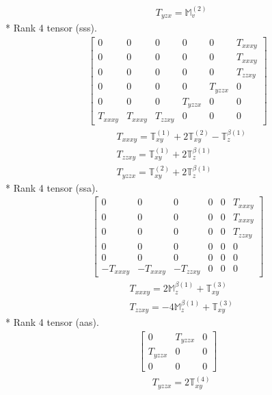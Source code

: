 \documentclass[fleqn,8pt,landscape]{jsarticle}
\begin{document}
\begin{align*}
& T_{yzx} = \mathbb{M}_{v}^{(2)}
\end{align*}
* Rank 4 tensor (sss).
\begin{align*}
\begin{bmatrix} 0 & 0 & 0 & 0 & 0 & T_{xxxy} \\ 0 & 0 & 0 & 0 & 0 & T_{xxxy} \\ 0 & 0 & 0 & 0 & 0 & T_{zzxy} \\ 0 & 0 & 0 & 0 & T_{yzzx} & 0 \\ 0 & 0 & 0 & T_{yzzx} & 0 & 0 \\ T_{xxxy} & T_{xxxy} & T_{zzxy} & 0 & 0 & 0 \end{bmatrix}
\end{align*}
\begin{align*}
& T_{xxxy} = \mathbb{T}_{xy}^{(1)} + 2 \mathbb{T}_{xy}^{(2)} - \mathbb{T}_{z}^{\beta(1)} \\
& T_{zzxy} = \mathbb{T}_{xy}^{(1)} + 2 \mathbb{T}_{z}^{\beta(1)} \\
& T_{yzzx} = \mathbb{T}_{xy}^{(2)} + 2 \mathbb{T}_{z}^{\beta(1)}
\end{align*}
* Rank 4 tensor (ssa).
\begin{align*}
\begin{bmatrix} 0 & 0 & 0 & 0 & 0 & T_{xxxy} \\ 0 & 0 & 0 & 0 & 0 & T_{xxxy} \\ 0 & 0 & 0 & 0 & 0 & T_{zzxy} \\ 0 & 0 & 0 & 0 & 0 & 0 \\ 0 & 0 & 0 & 0 & 0 & 0 \\ - T_{xxxy} & - T_{xxxy} & - T_{zzxy} & 0 & 0 & 0 \end{bmatrix}
\end{align*}
\begin{align*}
& T_{xxxy} = 2 \mathbb{M}_{z}^{\beta(1)} + \mathbb{T}_{xy}^{(3)} \\
& T_{zzxy} = - 4 \mathbb{M}_{z}^{\beta(1)} + \mathbb{T}_{xy}^{(3)}
\end{align*}
* Rank 4 tensor (aas).
\begin{align*}
\begin{bmatrix} 0 & T_{yzzx} & 0 \\ T_{yzzx} & 0 & 0 \\ 0 & 0 & 0 \end{bmatrix}
\end{align*}
\begin{align*}
& T_{yzzx} = 2 \mathbb{T}_{xy}^{(4)}
\end{align*}
\end{document}
